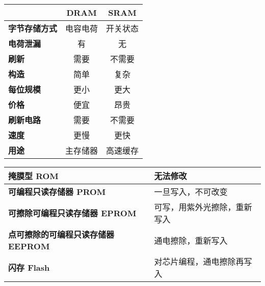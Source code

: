 \begin{table*}
	\begin{minipage}[b]{.5\linewidth}
	\centering
	\caption{RAM 区别}
	\begin{tabular}{|>{\bfseries}l|c|c|}
		\hline
		& \bfseries DRAM &\bfseries SRAM \\
		\hline
		字节存储方式 & 电容电荷 & 开关状态 \\
		电荷泄漏 & 有 & 无 \\
		刷新 & 需要 & 不需要 \\
		构造 & 简单 & 复杂 \\
		每位规模 & 更小 & 更大 \\
		价格 & 便宜 & 昂贵 \\
		刷新电路 & 需要 & 不需要 \\
		速度 & 更慢 & 更快 \\
		用途 & 主存储器 & 高速缓存 \\
		\hline
	\end{tabular}
	\end{minipage}
	\begin{minipage}[b]{.5\linewidth}
	\centering
	\caption{ROM 区别}
	\begin{tabular}{|>{\bfseries}p{10em}|p{8em}|}
		\hline
		掩膜型 ROM & 无法修改 \\
		\hline
		可编程只读存储器 PROM & 一旦写入，不可改变 \\
		\hline
		可擦除可编程只读存储器 EPROM & 可写，用紫外光擦除，重新写入 \\
		\hline
		点可擦除的可编程只读存储器 EEPROM & 通电擦除，重新写入 \\
		\hline
		闪存 Flash & 对芯片编程，通电擦除再写入 \\
		\hline
	\end{tabular}
	\end{minipage}
\end{table*}

